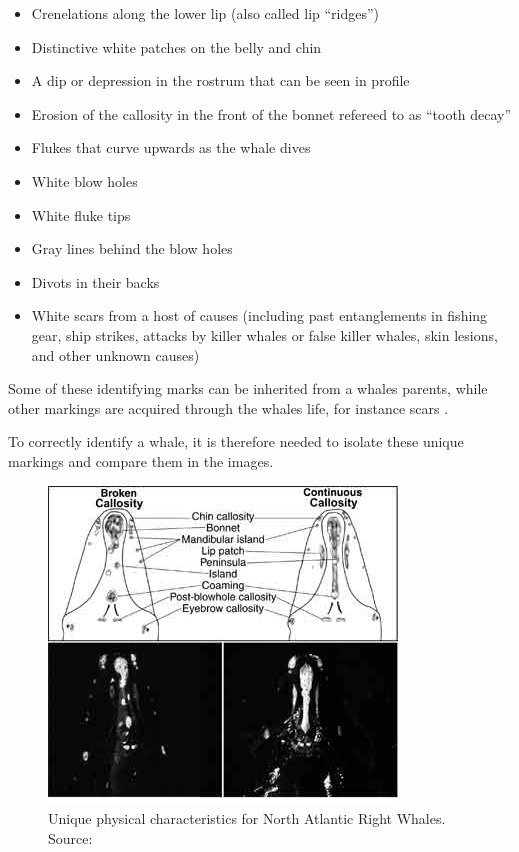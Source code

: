 \begin{itemize}
	\item Crenelations along the lower lip (also called lip “ridges”)
	\item Distinctive white patches on the belly and chin
	\item A dip or depression in the rostrum that can be seen in profile
	\item Erosion of the callosity in the front of the bonnet refereed to as “tooth decay”
	\item Flukes that curve upwards as the whale dives
	\item White blow holes
	\item White fluke tips
	\item Gray lines behind the blow holes
	\item Divots in their backs
	\item White scars from a host of causes (including past entanglements in fishing gear, ship strikes, attacks by killer whales or false killer whales, skin lesions, and other unknown causes)
\end{itemize}

Some of these identifying marks can be inherited from a whales parents, while other markings are acquired through the whales life, for instance scars \cite{neaq:whale-identity-markings}. 

To correctly identify a whale, it is therefore needed to isolate these unique markings and compare them in the images. 

\begin{figure}
	\centering
	\includegraphics[width=\linewidth]{Images/callosity_comparison}
	\caption{Unique physical characteristics for North Atlantic Right Whales. Source: \cite{neaq:whale-identity}}
	\label{fig:whale-collosity}
\end{figure}

